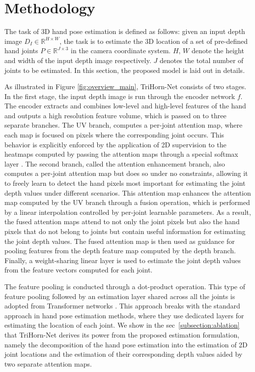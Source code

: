 \documentclass{article}
\begin{document}
\section{Methodology}
The task of 3D hand pose estimation is defined as follows: given an input depth image $D_I\in{\mathbb{R}^{H\times{W}}}$, the task is to estimate the 3D location of a set of pre-defined hand joints $P\in{\mathbb{R}^{J\times{3}}}$ in the camera coordinate system. $H$, $W$ denote the height and width of the input depth image respectively. $J$ denotes the total number of joints to be estimated. In this section, the proposed model is laid out in details.
\par
As illustrated in Figure \ref{fig:overview_main}, TriHorn-Net consists of two stages. In the first stage, the input depth image is run through the encoder network $f$. The encoder extracts and combines low-level and high-level features of the hand and outputs a high resolution feature volume, which is passed on to three separate branches. The UV branch, computes a per-joint attention map, where each map is focused on pixels where the corresponding joint occurs. This behavior is explicitly enforced by the application of 2D supervision to the heatmaps computed by passing the attention maps through a special softmax layer \cite{iqbal2018hand}. The second branch, called the attention enhancement branch, also computes a per-joint attention map but does so under no constraints, allowing it to freely learn to detect the hand pixels most important for estimating the joint depth values under different scenarios. This attention map enhances the attention map computed by the UV branch through a fusion operation, which is performed by a linear interpolation controlled by per-joint learnable parameters. As a result, the fused attention maps attend to not only the joint pixels but also the hand pixels that do not belong to joints but contain useful information for estimating the joint depth values. The fused attention map is then used as guidance for pooling features from the depth feature map computed by the depth branch. Finally, a weight-sharing linear layer is used to estimate the joint depth values from the feature vectors computed for each joint.
\par
The feature pooling is conducted through a dot-product operation. This type of feature pooling followed by an estimation layer shared across all the joints is adopted from Transformer networks \cite{vaswani2017attention}. This approach breaks with the standard approach in hand pose estimation methods, where they use dedicated layers for estimating the location of each joint. We show in the sec~\ref{subsection:ablation} that TriHorn-Net derives its power from the proposed estimation formulation, namely the decomposition of the hand pose estimation into the estimation of 2D joint locations and the estimation of their corresponding depth values aided by two separate attention maps.
\end{document}
